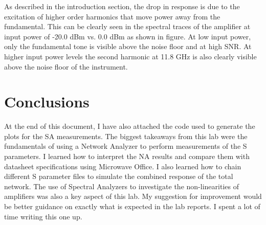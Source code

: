 \documentclass[twocolumn, aps, apl]{revtex4-1}
\begin{document}


As described in the introduction section, the drop in response is due to the excitation of higher order harmonics that move power away from the fundamental. This can be clearly seen in the spectral traces of the amplifier at input power of -20.0 dBm vs. 0.0 dBm as shown in figure. At low input power, only the fundamental tone is visible above the noise floor and at high SNR. At higher input power levels the second harmonic at 11.8 GHz is also clearly visible above the noise floor of the instrument.


\section*{Conclusions}
At the end of this document, I have also attached the code used to generate the plots for the SA measurements. The biggest takeaways from this lab were the fundamentals of using a Network Analyzer to perform measurements of the S parameters. I learned how to interpret the NA results and compare them with datasheet specifications using Microwave Office. I also learned how to chain different S parameter files to simulate the combined response of the total network. The use of Spectral Analyzers to investigate the non-linearities of amplifiers was also a key aspect of this lab. My suggestion for improvement would be better guidance on exactly what is expected in the lab reports. I spent a lot of time writing this one up.
\end{document}
